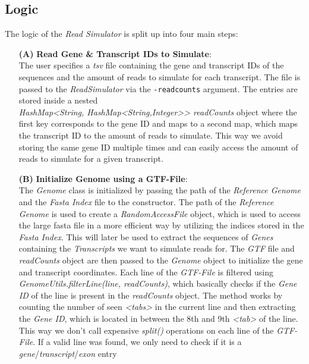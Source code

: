 \documentclass[12pt]{article}
\begin{document}
\subsection{Logic}
The logic of the \textit{Read Simulator} is split up into four main steps:
\begin{enumerate}
	\item[\textbf{(A)}] \textbf{Read Gene \& Transcript IDs to Simulate}:\\
		The user specifies a \textit{tsv} file containing the gene and transcript IDs of the sequences and the
		amount of reads to simulate for each transcript. The file is passed to the \textit{ReadSimulator}
		via the \texttt{-readcounts} argument. The entries are stored inside a nested \\
		\textit{HashMap<String, HashMap<String,Integer>\hspace{0.1mm}> readCounts} object where
		the first key corresponds to the gene ID and maps to a second map, which maps the transcript ID to the amount of reads to simulate.
		This way we avoid storing the same gene ID multiple times and can easily access the amount of reads to simulate for a given transcript.
	\item[\textbf{(B)}] \textbf{Initialize Genome using a GTF-File}:\\
		The \textit{Genome} class is initialized by passing the path of the \textit{Reference Genome} and the \textit{Fasta Index} file to the constructor.
		The path of the \textit{Reference Genome} is used to create a \textit{RandomAccessFile} object, which is used to
		access the large fasta file in a more efficient way by utilizing the indices stored in the \textit{Fasta Index}.
		This will later be used to extract the sequences of \textit{Genes} containing the \textit{Transcripts} we want to simulate reads for.
		The \textit{GTF} file and \textit{readCounts} object are then passed to the \textit{Genome} object to initialize the gene and transcript coordinates.
		Each line of the \textit{GTF-File} is filtered using \textit{GenomeUtils.filterLine(line, readCounts)}, which
		basically checks if the \textit{Gene ID} of the line is present in the \textit{readCounts} object.
		The method works by counting the number of seen \textit{<tabs>} in the current line and then extracting the \textit{Gene ID},
		which is located in between the 8th and 9th \textit{<tab>} of the line. This way we don't
		call expensive \textit{split()} operations on each line of the \textit{GTF-File}.
		If a valid line was found, we only need to check if it is a \textit{gene}/\textit{transcript}/\textit{exon} entry

\end{enumerate}
\end{document}
